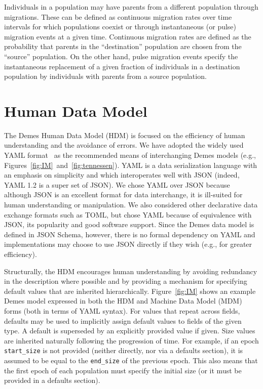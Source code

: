\documentclass[11pt]{article}
\begin{document}
Individuals in a population may have parents from a different
population through migrations. These can be defined as continuous migration
rates over time intervals for which populations coexist or through
instantaneous (or pulse) migration events at a given time. Continuous migration
rates are defined as the probability that parents in the ``destination''
population are chosen from the ``source'' population.
On the other hand, pulse
migration events specify the instantaneous replacement of a given fraction of
individuals in a destination population by individuals with parents from a
source population.


\section{Human Data Model}\label{sec:appendix-spec}

The Demes Human Data Model (HDM) is focused on the efficiency of
human understanding and the avoidance of errors. We have adopted the widely
used YAML format~\citep{ben2009yaml} as the recommended means of interchanging
Demes models (e.g., Figures~\ref{fig:IM}~and~\ref{fig:tennessen}). YAML is a data
serialization language with an emphasis on simplicity and which interoperates well
with JSON (indeed, YAML 1.2 is a super set of JSON). We chose YAML over JSON
because although JSON is an excellent format for data interchange, it is
ill-suited for human understanding or manipulation. We also considered other
declarative data exchange formats such as TOML,
but chose YAML because of equivalence with JSON,
its popularity and good software support.
Since the Demes data model is defined in JSON Schema,
however, there is no formal dependency on YAML and implementations may choose
to use JSON directly if they wish (e.g., for greater efficiency).

Structurally, the HDM encourages human understanding
by avoiding redundancy in the description where possible and by providing a
mechanism for specifying default values that are inherited hierarchically.
Figure~\ref{fig:IM} shows an example Demes model expressed in both the
HDM and Machine Data Model (MDM) forms (both in terms of YAML syntax).
For values that repeat
across fields, defaults may be used to implicitly assign default values to
fields of the given type.  A default is superseded by an explicitly provided
value if given. Size values are inherited naturally following the
progression of time. For example, if an epoch \texttt{start\_size} is not
provided (neither directly, nor via a defaults section),
it is assumed to be equal to the \texttt{end\_size} of the previous
epoch. This also means that the first epoch of each population must specify the
initial size (or it must be provided in a defaults section).
\end{document}
